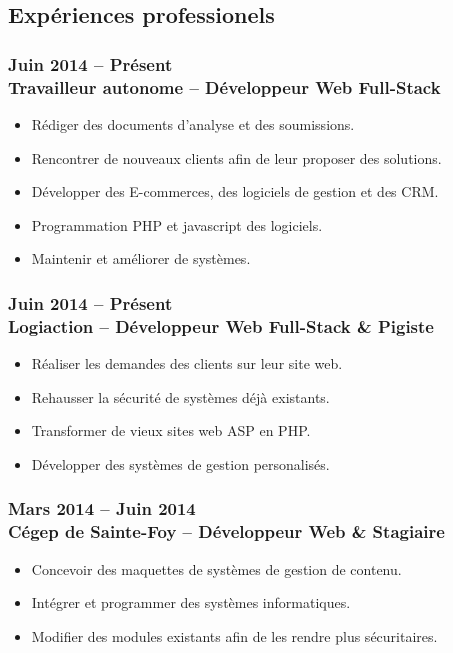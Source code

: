 \documentclass{resume}
\begin{document}
\begin{multicols}{2}
		\columnbreak

		\subsection*{Expériences professionels}
			\subsubsection*{Juin 2014 – Présent \\ Travailleur autonome – Développeur Web Full-Stack}
			\begin{itemize}
				\scriptsize
				\item Rédiger des documents d’analyse et des soumissions.
				\item Rencontrer de nouveaux clients afin de leur proposer des solutions.
				\item Développer des E-commerces, des logiciels de gestion et des CRM.
				\item Programmation PHP et javascript des logiciels.
				\item Maintenir et améliorer de systèmes.
			\end{itemize}

			\subsubsection*{Juin 2014 – Présent \\ Logiaction – Développeur Web Full-Stack \& Pigiste}
			\begin{itemize}
				\scriptsize
				\item Réaliser les demandes des clients sur leur site web.
				\item Rehausser la sécurité de systèmes déjà existants.
				\item Transformer de vieux sites web ASP en PHP.
				\item Développer des systèmes de gestion personalisés.
			\end{itemize}

			\subsubsection*{Mars 2014 – Juin 2014 \\ Cégep de Sainte-Foy – Développeur Web \& Stagiaire}
			\begin{itemize}
				\scriptsize
				\item Concevoir des maquettes de systèmes de gestion de contenu.
				\item Intégrer et programmer des systèmes informatiques.
				\item Modifier des modules existants afin de les rendre plus sécuritaires.
			\end{itemize}
	\end{multicols}
\end{document}
